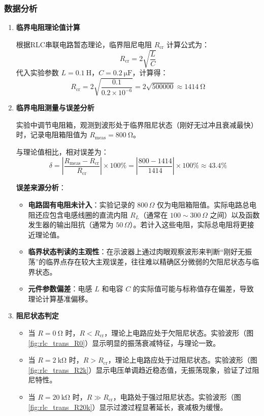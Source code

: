 \documentclass[11pt]{article}
\begin{document}
\subsubsection{数据分析}
\begin{enumerate}
    \item \textbf{临界电阻理论值计算}
    
    根据RLC串联电路暂态理论，临界阻尼电阻 $R_{\text{cr}}$ 计算公式为：
    \[ R_{\text{cr}} = 2\sqrt{\frac{L}{C}} \]
    代入实验参数 $L=\SI{0.1}{\henry}$，$C=\SI{0.2}{\micro\farad}$，计算得：
    \[ R_{\text{cr}} = 2\sqrt{\frac{0.1}{0.2 \times 10^{-6}}} = 2\sqrt{500000} \approx \SI{1414}{\ohm} \]

    \item \textbf{临界电阻测量与误差分析}
    
    实验中调节电阻箱，观测到波形处于临界阻尼状态（刚好无过冲且衰减最快）时，记录电阻箱阻值为 $R_{\text{meas}} = \SI{800}{\ohm}$。
    
    与理论值相比，相对误差为：
    \[ \delta = \left| \frac{R_{\text{meas}} - R_{\text{cr}}}{R_{\text{cr}}} \right| \times 100\% = \left| \frac{800 - 1414}{1414} \right| \times 100\% \approx 43.4\% \]
    
    \textbf{误差来源分析}：
    \begin{itemize}
        \item \textbf{电路固有电阻未计入}：实验记录的 $800\,\Omega$ 仅为电阻箱阻值。实际电路总电阻还应包含电感线圈的直流内阻 $R_L$（通常在 $100\sim 300\,\Omega$ 之间）以及函数发生器的输出阻抗（通常为 $50\,\Omega$）。若计入这些电阻，实际总电阻将更接近理论值。
        \item \textbf{临界状态判读的主观性}：在示波器上通过肉眼观察波形来判断“刚好无振荡”的临界点存在较大主观误差，往往难以精确区分微弱的欠阻尼状态与临界状态。
        \item \textbf{元件参数偏差}：电感 $L$ 和电容 $C$ 的实际值可能与标称值存在偏差，导致理论计算基准偏移。
    \end{itemize}

    \item \textbf{阻尼状态判定}
    \begin{itemize}
        \item 当 $R = \SI{0}{\ohm}$ 时，$R < R_{\text{cr}}$，理论上电路应处于欠阻尼状态。实验波形（图\ref{fig:rlc_trans_R0}）显示明显的振荡衰减特征，与理论一致。
        \item 当 $R = \SI{2}{\kilo\ohm}$ 时，$R > R_{\text{cr}}$，理论上电路应处于过阻尼状态。实验波形（图\ref{fig:rlc_trans_R2k}）显示电压单调趋近稳态值，无振荡现象，验证了过阻尼特性。
        \item 当 $R = \SI{20}{\kilo\ohm}$ 时，$R \gg R_{\text{cr}}$，电路处于强过阻尼状态。实验波形（图\ref{fig:rlc_trans_R20k}）显示过渡过程显著延长，衰减极为缓慢。
    \end{itemize}
\end{enumerate}
\end{document}
